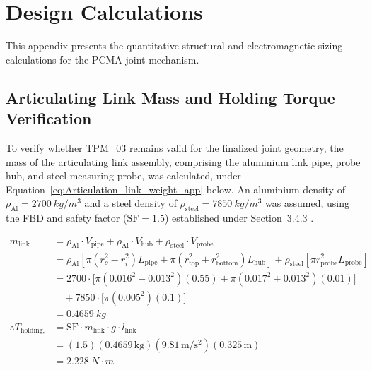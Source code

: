 \chapter{Design Calculations}
\label{ch:design_calculations}

This appendix presents the quantitative structural and electromagnetic sizing calculations for the PCMA joint mechanism.

\section{Articulating Link Mass and Holding Torque Verification}
\label{sec:link_mass_calc}

To verify whether TPM\_03 remains valid for the finalized joint geometry, the mass of the articulating link assembly, comprising the aluminium link pipe, probe hub, and steel measuring probe, was calculated, under Equation~\ref{eq:Articulation_link_weight_app} below. An aluminium density of $\rho_{\text{Al}} = \SI{2700}{kg/m^3}$ and a steel density of $\rho_{\text{steel}} = \SI{7850}{kg/m^3}$ was assumed, using the FBD and safety factor ($\text{SF} = 1.5$) established under Section~3.4.3 \citep{Hibbler:2017}.

\begin{equation}
	\label{eq:Articulation_link_weight_app}
	\begin{aligned}
		m_{\text{link}} &= \rho_{\text{Al}} \cdot V_{\text{pipe}} + \rho_{\text{Al}} \cdot V_{\text{hub}} + \rho_{\text{steel}} \cdot V_{\text{probe}} \\
		&= \rho_{\text{Al}} \left[ \pi (r_o^2 - r_i^2) L_{\text{pipe}} + \pi (r_{\text{top}}^2 + r_{\text{bottom}}^2) L_{\text{hub}} \right] + \rho_{\text{steel}} \left[ \pi r_{\text{probe}}^2 L_{\text{probe}} \right] \\
		&= 2700 \cdot \Big[ \pi(0.016^2 - 0.013^2)(0.55) + \pi(0.017^2 + 0.013^2)(0.01) \Big] \\
		&\quad + 7850 \cdot \Big[ \pi(0.005^2)(0.1) \Big] \\
		&= \SI{0.4659}{kg} \\
		\therefore T_{\text{holding, verified}} &= \text{SF} \cdot m_{\text{link}} \cdot g \cdot l_{\text{link}} \\
		&= (1.5)(0.4659\,\mathrm{kg})(9.81\,\mathrm{m/s^2})(0.325\,\mathrm{m}) \\
		&= \SI{2.228}{N\cdot m}
	\end{aligned}
\end{equation}

